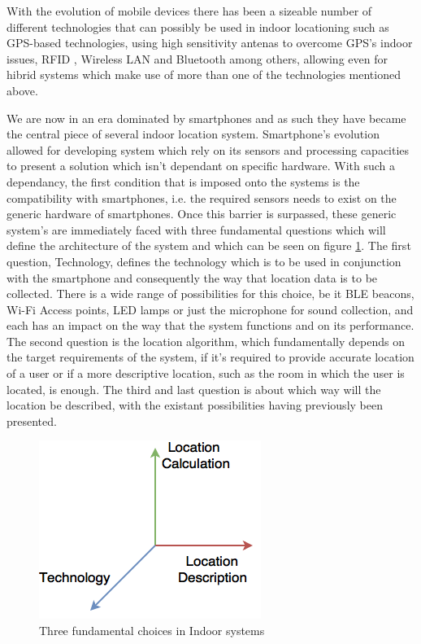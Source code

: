 \documentclass[a4paper]{IEEEtran}
\begin{document}
With the evolution of mobile devices there has been a sizeable number of different technologies that can possibly be used in indoor locationing \cite{surveythesis,survey2} such as GPS-based technologies, using high sensitivity antenas to overcome GPS's indoor issues, RFID , Wireless LAN and Bluetooth among others, allowing even for hibrid systems which make use of more than one of the technologies mentioned above. 

We are now in an era dominated by smartphones and as such they have became the central piece of several indoor location system. Smartphone's evolution allowed for developing system which rely on its sensors and processing capacities to present a solution which isn't dependant on specific hardware. With such a dependancy, the first condition that is imposed onto the systems is the compatibility with smartphones, i.e. the required sensors needs to exist on the generic hardware of smartphones. Once this barrier is surpassed, these generic system's are immediately faced with three fundamental questions which will define the architecture of the system and which can be seen on figure \ref{fig:choices}. The first question, Technology, defines the technology which is to be used in conjunction with the smartphone and consequently the way that location data is to be collected. There is a wide range of possibilities for this choice, be it BLE beacons, Wi-Fi Access points, LED lamps or just the microphone for sound collection, and each has an impact on the way that the system functions and on its performance. The second question is the location algorithm, which fundamentally depends on the target requirements of the system, if it's required to provide accurate location of a user or if a more descriptive location, such as the room in which the user is located, is enough. The third and last question is about which way will the location be described, with the existant possibilities having previously been presented. 

\begin{figure}[htp]
	\centering
		\includegraphics[width=0.5\linewidth]{figures/vectors.png}
	\caption[]{Three fundamental choices in Indoor systems}
	\label{fig:choices}
\end{figure}
\end{document}
